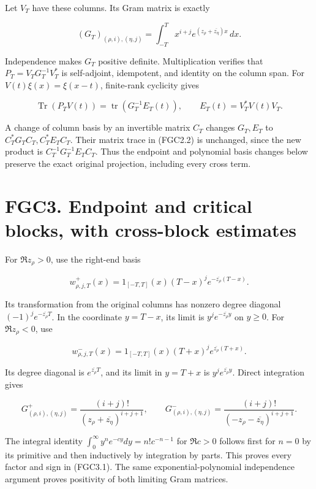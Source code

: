 Let \(V_T\) have these columns. Its Gram matrix is exactly

\[
 (G_T)_{(\rho,i),(\eta,j)}
 =\int_{-T}^T x^{i+j}e^{(z_\rho+\overline{z_\eta})x}\,dx.
\tag{FGC2.1}
\]

Independence makes \(G_T\) positive definite. Multiplication verifies
that \(P_T=V_TG_T^{-1}V_T^*\) is self-adjoint, idempotent, and identity
on the column span. For \(V(t)\xi(x)=\xi(x-t)\), finite-rank cyclicity
gives

\[
 \operatorname{Tr}(P_TV(t))
 =\operatorname{tr}(G_T^{-1}E_T(t)),
 \qquad E_T(t)=V_T^*V(t)V_T.
\tag{FGC2.2}
\]

A change of column basis by an invertible matrix \(C_T\) changes
\(G_T,E_T\) to \(C_T^*G_TC_T,C_T^*E_TC_T\). Their matrix trace in
(FGC2.2) is unchanged, since the new product is
\(C_T^{-1}G_T^{-1}E_TC_T\). Thus the endpoint and polynomial basis
changes below preserve the exact original projection, including every
cross term.

\section{FGC3. Endpoint and critical blocks, with cross-block
estimates}\label{fgc3.-endpoint-and-critical-blocks-with-cross-block-estimates}

For \(\Re z_\rho>0\), use the right-end basis

\[
 w^+_{\rho,j,T}(x)=1_{[-T,T]}(x)(T-x)^j
 e^{-\overline{z_\rho}(T-x)}.
\]

Its transformation from the original columns has nonzero degree diagonal
\((-1)^j e^{-\overline{z_\rho}T}\). In the coordinate \(y=T-x\), its
limit is \(y^je^{-\overline{z_\rho}y}\) on \(y\geq0\). For
\(\Re z_\rho<0\), use

\[
 w^-_{\rho,j,T}(x)=1_{[-T,T]}(x)(T+x)^j
 e^{\overline{z_\rho}(T+x)}.
\]

Its degree diagonal is \(e^{\overline{z_\rho}T}\), and its limit in
\(y=T+x\) is \(y^je^{\overline{z_\rho}y}\). Direct integration gives

\[
 G^+_{(\rho,i),(\eta,j)}
 =\frac{(i+j)!}{(z_\rho+\overline{z_\eta})^{i+j+1}},\qquad
 G^-_{(\rho,i),(\eta,j)}
 =\frac{(i+j)!}{(-z_\rho-\overline{z_\eta})^{i+j+1}}.
\tag{FGC3.1}
\]

The integral identity \(\int_0^\infty y^n e^{-cy}dy=n!c^{-n-1}\) for
\(\Re c>0\) follows first for \(n=0\) by its primitive and then
inductively by integration by parts. This proves every factor and sign
in (FGC3.1). The same exponential-polynomial independence argument
proves positivity of both limiting Gram matrices.

